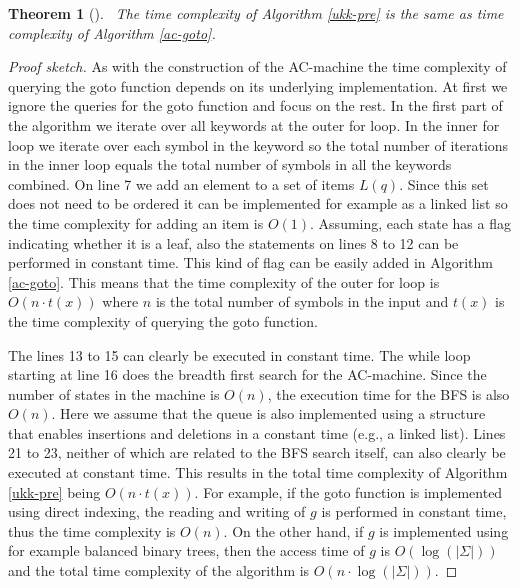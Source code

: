 \documentclass[english,twoside,censored,csm,algorithms-track-2020]{HYthesisML}
\theoremstyle{plain}
\newtheorem{theorem}{Theorem}[chapter]
\theoremstyle{definition}
\numberwithin{testexample}{chapter}
\begin{document}
\begin{theorem}[]~\label{thm-time-pre}
  The time complexity of Algorithm \ref{ukk-pre} is the same as time complexity of
  Algorithm \ref{ac-goto}.
\end{theorem}
\begin{proof}[Proof sketch]
As with the construction of
the AC-machine the time complexity of querying the goto function depends on its underlying
implementation. At first we ignore the queries for the goto function and focus on the rest.
In the first part of the algorithm we iterate over all keywords at the outer for loop. In the
inner for loop we iterate over each symbol in the keyword so the total number of iterations
in the inner loop equals the total number of symbols in all the keywords combined. On line 7
we add an element to a set of items $L(q)$. Since this set does not need to be ordered it can be
implemented for example as a linked list so the time complexity for adding an item is $O(1)$.
Assuming, each state has a flag indicating whether it is a leaf, also the statements on
lines 8 to 12 can be performed in constant time. This kind of flag can be easily
added in Algorithm \ref{ac-goto}.
This means that
the time complexity of the outer for loop is $O(n\cdot t(x))$ where $n$ is the total number of
symbols in the input and $t(x)$ is the time complexity of querying the goto function.

The lines 13 to 15 can clearly be executed in constant time. The while loop starting at line 16
does the breadth first search for the AC-machine. Since the number of states in the machine is
$O(n)$, the execution time for the BFS is also $O(n)$. Here we assume that the queue is also
implemented using a structure that enables insertions and deletions in a constant time (e.g.,
a linked list). Lines 21 to 23, neither of which are related to the BFS search itself, can also clearly
be executed at constant time. This results in the total time complexity of Algorithm \ref{ukk-pre} being
$O(n\cdot t(x))$. For example, if the goto function is implemented using direct indexing, the
reading and writing of $g$ is performed in constant time, thus the time complexity is $O(n)$.
On the other hand, if $g$ is implemented using for example balanced binary trees, then the access
time of $g$ is $O(\log (|\Sigma|))$ and the total time complexity of the algorithm
is $O(n\cdot\log(|\Sigma|))$.
\end{proof}
\end{document}
